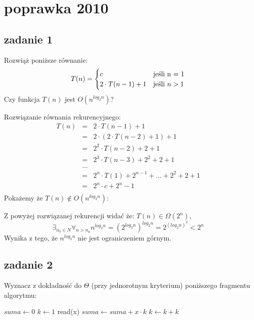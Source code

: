 \documentclass[svgnames]{report}
\begin{document}
\tableofcontents


\chapter{poprawka 2010}

\section{zadanie 1}
\begin{framed}
Rozwiąż poniższe równanie:
\begin{equation*}
T(n) = 
	\begin{cases}
		c 					&	\hbox{jeśli n = 1}		\\
		2 \cdot T(n-1) + 1 	&	\hbox{jeśli $n > 1$}	\\
	\end{cases}
\end{equation*}
Czy funkcja $T(n)$ jest $O(n^{log_2 n})$?

\end{framed}

Rozwiązanie równania rekurencyjnego:
\begin{eqnarray*}
T(n) 	&=& 2 \cdot T(n-1) + 1	\\
		&=&	2 \cdot ( 2\cdot T(n-2) + 1 ) + 1	\\
		&=& 2^2 \cdot T(n-2) + 2 + 1	\\
		&=&	2^3 \cdot T(n-3) + 2^2 + 2 + 1 \\
		&...&	\\
		&=&	2^n\cdot T(1) + 2^{n-1} + ... + 2^2 + 2 + 1 \\
		&=& 2^n \cdot c + 2^n - 1	\\
\end{eqnarray*}
Pokażemy że $T(n) \not\in O(n^{log_2 n})$:

Z powyżej rozwiązanej rekurencji widać że: $T(n) \in \Omega (2^n)$, 
\begin{equation}
	\exists_{n_0 \in N} \forall_{n > n_0} n^{log_2 n} = \left(2^{log_2 n}\right)^{log_2 n} = 2^{(log_2 n)^2} < 2^n
\end{equation}
Wynika z tego, że $n^{log_2 n}$ nie jest ograniczeniem górnym.


\section{zadanie 2}
\begin{framed}
Wyznacz z dokładność do $\Theta$ (przy jednorotnym kryterium) poniższego fragmentu algorytmu:
\begin{algorithmic}
\STATE $suma \leftarrow 0$
	\STATE $k \leftarrow 1$
		\STATE read(x)
		\STATE $suma \leftarrow suma + x \cdot k$
		\STATE $k \leftarrow k + k$
	\ENDWHILE
\ENDFOR
\end{algorithmic}
\end{framed}
\end{document}
